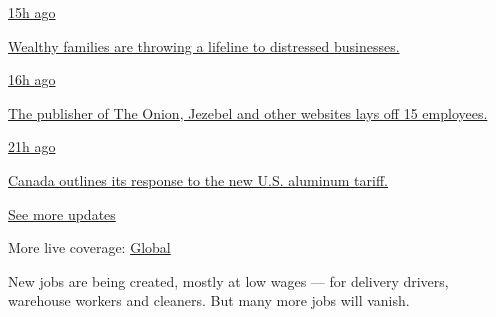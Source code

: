 \href{https://www.nytimes.com/live/2020/08/07/business/stock-market-today-coronavirus?action=click\&pgtype=Article\&state=default\&region=MAIN_CONTENT_1\&context=storylines_live_updates\#wealthy-families-are-throwing-a-lifeline-to-distressed-businesses}{15h
ago}

\href{https://www.nytimes.com/live/2020/08/07/business/stock-market-today-coronavirus?action=click\&pgtype=Article\&state=default\&region=MAIN_CONTENT_1\&context=storylines_live_updates\#wealthy-families-are-throwing-a-lifeline-to-distressed-businesses}{Wealthy
families are throwing a lifeline to distressed businesses.}

\href{https://www.nytimes.com/live/2020/08/07/business/stock-market-today-coronavirus?action=click\&pgtype=Article\&state=default\&region=MAIN_CONTENT_1\&context=storylines_live_updates\#the-publisher-of-the-onion-jezebel-and-other-websites-lays-off-15-employees}{16h
ago}

\href{https://www.nytimes.com/live/2020/08/07/business/stock-market-today-coronavirus?action=click\&pgtype=Article\&state=default\&region=MAIN_CONTENT_1\&context=storylines_live_updates\#the-publisher-of-the-onion-jezebel-and-other-websites-lays-off-15-employees}{The
publisher of The Onion, Jezebel and other websites lays off 15
employees.}

\href{https://www.nytimes.com/live/2020/08/07/business/stock-market-today-coronavirus?action=click\&pgtype=Article\&state=default\&region=MAIN_CONTENT_1\&context=storylines_live_updates\#canada-outlines-its-response-to-the-new-us-aluminum-tariff}{21h
ago}

\href{https://www.nytimes.com/live/2020/08/07/business/stock-market-today-coronavirus?action=click\&pgtype=Article\&state=default\&region=MAIN_CONTENT_1\&context=storylines_live_updates\#canada-outlines-its-response-to-the-new-us-aluminum-tariff}{Canada
outlines its response to the new U.S. aluminum tariff.}

\href{https://www.nytimes.com/live/2020/08/07/business/stock-market-today-coronavirus?action=click\&pgtype=Article\&state=default\&region=MAIN_CONTENT_1\&context=storylines_live_updates}{See
more updates}

More live coverage:
\href{https://www.nytimes.com/2020/08/07/world/covid-19-news.html?action=click\&pgtype=Article\&state=default\&region=MAIN_CONTENT_1\&context=storylines_live_updates}{Global}

New jobs are being created, mostly at low wages --- for delivery
drivers, warehouse workers and cleaners. But many more jobs will vanish.

